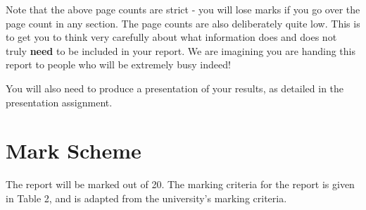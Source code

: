 \documentclass[11pt,a4paper]{article}
\begin{document}
Note that the above page counts are strict - you will lose marks if you go over the page count in any section. The page counts are also deliberately quite low. This is to get you to think very carefully about what information does and does not truly \textbf{need} to be included in your report. We are imagining you are handing this report to people who will be extremely busy indeed!

You will also need to produce a presentation of your results, as detailed in the presentation assignment.

\section{Mark Scheme}

The report will be marked out of 20. The marking criteria for the report is given in Table 2, and is adapted from the university's marking criteria.
\end{document}
